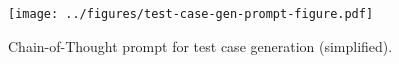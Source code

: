 \begin{figure}[bh]
    \centering
    \vspace{-0.3cm}
    \texttt{[image: ../figures/test-case-gen-prompt-figure.pdf]}
    \vspace{-0.5cm}
    \caption{Chain-of-Thought prompt for test case generation (simplified).}
    \label{fig:test-case-gen-prompt}
    
\end{figure}

